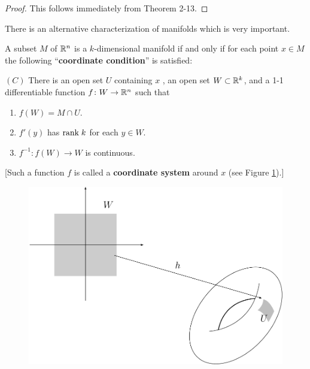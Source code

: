 \begin{proof}
    This follows immediately from Theorem 2-13. 
\end{proof}

There is an alternative characterization of manifolds which
is very important.

\begin{theorem}
    A subset $M$ of $\mathbb{R}^n$ is a $k$-dimensional manifold if and only if for 
    each point $x\in M$ the following ``\textbf{coordinate condition}'' is satisfied:
    
    \vspace*{1em}
    \noindent$(C)$ There is an open set $U$ containing $x$ , an open set $W\subset\mathbb{R}^k$,
    and a 1-1 differentiable function $f\colon{}W\to\mathbb{R}^n$ such that
    \begin{enumerate}[label=\upshape{(\arabic*)}]
        \item $f(W)=M\cap U$.
        \item $f'(y)$ has $\mathrm{rank}\; k$ for each $y\in W$.
        \item $f^{-1}\colon{}f(W)\to W$ is continuous.
    \end{enumerate}
\end{theorem}

[Such a function $f$ is called a \textbf{coordinate system} around $x$ (see Figure \ref{Fig 5-2}).]

\begin{figure}[!htb]
    \centering
    \includegraphics[width=.75\linewidth]{./pics/Fig5-2.pdf}
    \caption{}
    \label{Fig 5-2}
\end{figure}

